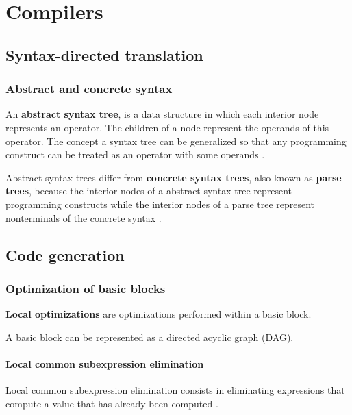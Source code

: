 \chapter{Compilers}

\section{Syntax-directed translation}

\subsection{Abstract and concrete syntax}\label{Abstract and concrete syntax}

An \textbf{abstract syntax tree}, is a data structure in which each interior node represents an operator. The children of a node represent the operands of this operator.
The concept a syntax tree can be generalized so that any programming construct can be treated as an operator with some operands \cite[p.~69]{compilers-aho-2007}.

Abstract syntax trees differ from \textbf{concrete syntax trees}, also known as \textbf{parse trees}, because the interior nodes of a abstract syntax tree represent programming constructs while the interior nodes of a parse tree represent nonterminals of the concrete syntax \cite[p.~69]{compilers-aho-2007}.

\section{Code generation}

\subsection{Optimization of basic blocks}

\textbf{Local optimizations} are optimizations performed within a basic block.

A basic block can be represented as a directed acyclic graph (DAG).

\subsubsection{Local common subexpression elimination}

Local common subexpression elimination consists in eliminating expressions that compute a value that has already been computed \cite[p.~533]{compilers-aho-2007}.

